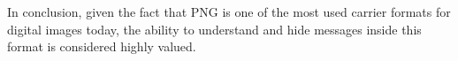 In conclusion, given the fact that PNG is one of the most used carrier formats for digital images today, the ability to understand and hide messages inside this format is considered highly valued.
